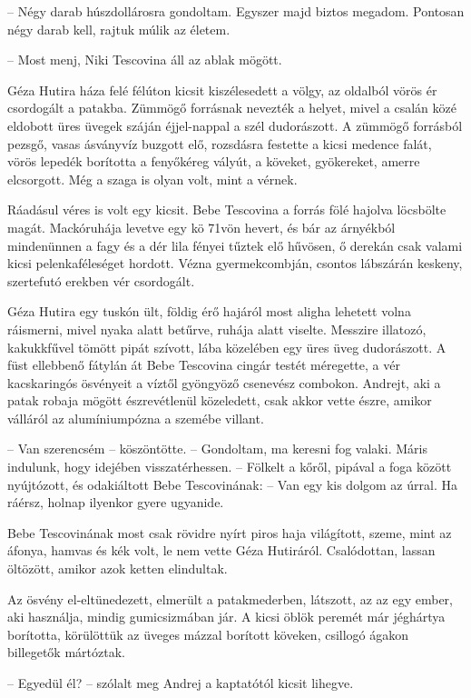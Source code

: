 \documentclass{IEEEtran}
\begin{document}
– Négy darab húszdollárosra gondoltam. Egyszer majd biztos megadom. Pontosan
négy darab kell, rajtuk múlik az életem.

– Most menj, Niki Tescovina áll az ablak mögött.

Géza Hutira háza felé félúton kicsit kiszélesedett a völgy, az oldalból vörös
ér csordogált a patakba. Zümmögő forrásnak nevezték a helyet, mivel a csalán
közé eldobott üres üvegek száján éjjel-nappal a szél dudorászott. A zümmögő
forrásból pezsgő, vasas ásványvíz buzgott elő, rozsdásra festette a kicsi
medence falát, vörös lepedék borította a fenyőkéreg vályút, a köveket,
gyökereket, amerre elcsorgott. Még a szaga is olyan volt, mint a vérnek.

Ráadásul véres is volt egy kicsit. Bebe Tescovina a forrás fölé hajolva
löcsbölte magát. Mackóruhája levetve egy kö 71vön hevert, és bár az árnyékból
mindenünnen a fagy és a dér lila fényei tűztek elő hűvösen, ő derekán csak
valami kicsi pelenkaféleséget hordott. Vézna gyermekcombján, csontos lábszárán
keskeny, szertefutó erekben vér csordogált.

Géza Hutira egy tuskón ült, földig érő hajáról most aligha lehetett volna
ráismerni, mivel nyaka alatt betűrve, ruhája alatt viselte. Messzire illatozó,
kakukkfűvel tömött pipát szívott, lába közelében egy üres üveg dudorászott. A
füst ellebbenő fátylán át Bebe Tescovina cingár testét méregette, a vér
kacskaringós ösvényeit a víztől gyöngyöző csenevész combokon. Andrejt, aki a
patak robaja mögött észrevétlenül közeledett, csak akkor vette észre, amikor
válláról az alumíniumpózna a szemébe villant.

– Van szerencsém – köszöntötte. – Gondoltam, ma keresni fog valaki. Máris
indulunk, hogy idejében visszatérhessen. – Fölkelt a kőről, pipával a foga
között nyújtózott, és odakiáltott Bebe Tescovinának: – Van egy kis dolgom az
úrral. Ha ráérsz, holnap ilyenkor gyere ugyanide.

Bebe Tescovinának most csak rövidre nyírt piros haja világított, szeme, mint
az áfonya, hamvas és kék volt, le nem vette Géza Hutiráról. Csalódottan,
lassan öltözött, amikor azok ketten elindultak.

Az ösvény el-eltünedezett, elmerült a patakmederben, látszott, az az egy
ember, aki használja, mindig gumicsizmában jár. A kicsi öblök peremét már
jéghártya borította, körülöttük az üveges mázzal borított köveken, csillogó
ágakon billegetők mártóztak.

– Egyedül él? – szólalt meg Andrej a kaptatótól kicsit lihegve.
\end{document}
